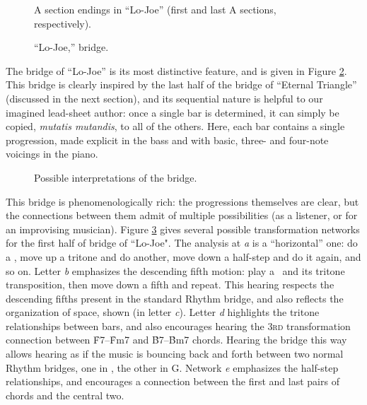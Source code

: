 \begin{figure}[tbp]
  \caption[A section endings in ``Lo-Joe.'']{%
    A section endings in ``Lo-Joe'' (first and last A sections, respectively).}
  \label{lj:a-sect-endings}
\end{figure}

\begin{figure}[tbp]
  \caption{``Lo-Joe,'' bridge.}
  \label{lj:bridge}
\end{figure}

The bridge of ``Lo-Joe'' is its most distinctive feature, and is given in
Figure \ref{lj:bridge}. This bridge is clearly inspired by the last half of
the bridge of ``Eternal Triangle'' (discussed in the next section), and its
sequential nature is helpful to our imagined lead-sheet author: once a single bar
is determined, it can simply be copied, \emph{mutatis mutandis}, to all of the
others. Here, each bar contains a single \tf progression, made explicit in the
bass and with basic, three- and four-note voicings in the piano.

\begin{figure}[tbp]
  \caption{Possible interpretations of the bridge.}
  \label{lj:bridge-trans}
\end{figure}

This bridge is phenomenologically rich: the \tf progressions themselves are
clear, but the connections between them admit of multiple possibilities (as a
listener, or for an improvising musician). Figure \ref{lj:bridge-trans} gives
several possible transformation networks for the first half of bridge of
``Lo-Joe". The analysis at \emph{a} is a ``horizontal'' one: do a \tf, move up
a tritone and do another, move down a half-step and do it again, and so on.
Letter \emph{b} emphasizes the descending fifth motion: play a \tf\ and its
tritone transposition, then move down a fifth and repeat. This hearing
respects the descending fifths present in the standard Rhythm bridge, and also
reflects the organization of \tf space, shown (in letter \emph{c}). Letter
\emph{d} highlights the tritone relationships between bars, and also
encourages hearing the \textsc{3rd} transformation connection between
\h{F7}--\h{Fm7} and \h{B7}--\h{Bm7} chords. Hearing the bridge this way allows
hearing as if the music is bouncing back and forth between two normal Rhythm
bridges, one in \Dflat, the other in G. Network \emph{e} emphasizes the
half-step relationships, and encourages a connection between the first and
last pairs of chords and the central two.

